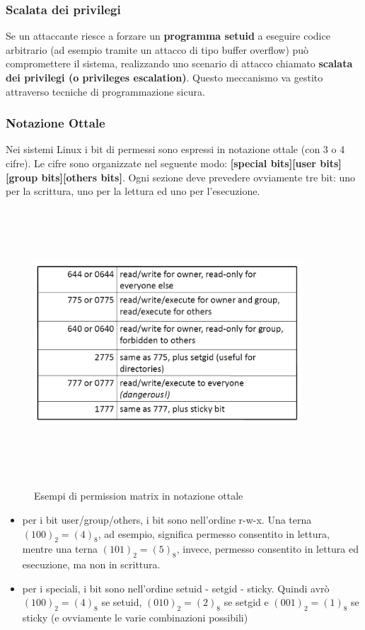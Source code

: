 \subsubsection{Scalata dei privilegi}
Se un attaccante riesce a forzare un \textbf{programma setuid} a eseguire codice arbitrario (ad esempio tramite un attacco di tipo buffer overflow) può compromettere il sistema, realizzando uno scenario di attacco chiamato \textbf{scalata dei privilegi (o privileges escalation)}. Questo meccanismo va gestito attraverso tecniche di programmazione sicura.

\subsubsection{Notazione Ottale}
Nei sistemi Linux i bit di permessi sono espressi in notazione ottale (con 3 o 4 cifre). Le cifre sono organizzate nel seguente modo: \newline
\textbf{[special bits][user bits][group bits][others bits]}. Ogni sezione deve prevedere ovviamente tre bit: uno per la scrittura, uno per la lettura ed uno per l'esecuzione. 

\begin{figure}[htbp]
	\centering%
	\subfigure%
	{\includegraphics[height=10cm, width=10cm, keepaspectratio]{Immagini/sistemi_operativi/notazione_ottale.png}}
	\caption{Esempi di permission matrix in notazione ottale\label{fig:notazione_ottale}} 	
\end{figure}
\begin{itemize}
  \item per i bit user/group/others, i bit sono nell'ordine r-w-x. Una terna $(100)_{2} = (4)_{8}$, ad esempio, significa permesso consentito in lettura, mentre una terna $(101)_{2} = (5)_{8}$, invece, permesso consentito in lettura ed esecuzione, ma non in scrittura.
  \item per i speciali, i bit sono nell'ordine setuid - setgid - sticky. Quindi avrò $(100)_{2} = (4)_{8}$ se setuid, $(010)_{2} = (2)_{8}$ se setgid e $(001)_{2} = (1)_{8}$ se sticky (e ovviamente le varie combinazioni possibili)
\end{itemize}

